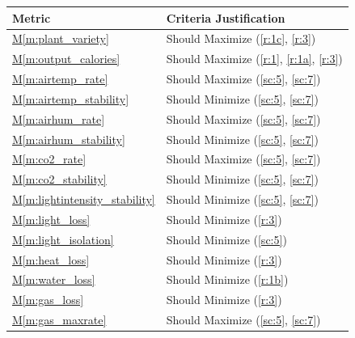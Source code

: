 \documentclass{../tex/report}
\newcommand{\mref}[1]{\hyperref[#1]{M\ref{#1}}}
\begin{document}
\begin{tabular}{|l|p{14.35cm}|}
    \hline
    \textbf{Metric}                     & \textbf{Criteria          \hfill Justification}                       \\ \hline
    \mref{m:plant_variety}              & Should Maximize           \hfill (\ref{r:1c}, \ref{r:3})              \\ \hline
    \mref{m:output_calories}            & Should Maximize           \hfill (\ref{r:1}, \ref{r:1a}, \ref{r:3})   \\ \hline
    \mref{m:airtemp_rate}               & Should Maximize           \hfill (\ref{sc:5}, \ref{sc:7})             \\ \hline
    \mref{m:airtemp_stability}          & Should Minimize           \hfill (\ref{sc:5}, \ref{sc:7})             \\ \hline
    \mref{m:airhum_rate}                & Should Maximize           \hfill (\ref{sc:5}, \ref{sc:7})             \\ \hline
    \mref{m:airhum_stability}           & Should Minimize           \hfill (\ref{sc:5}, \ref{sc:7})             \\ \hline
    \mref{m:co2_rate}                   & Should Maximize           \hfill (\ref{sc:5}, \ref{sc:7})             \\ \hline
    \mref{m:co2_stability}              & Should Minimize           \hfill (\ref{sc:5}, \ref{sc:7})             \\ \hline
    \mref{m:lightintensity_stability}   & Should Minimize           \hfill (\ref{sc:5}, \ref{sc:7})             \\ \hline
    \mref{m:light_loss}                 & Should Minimize           \hfill (\ref{r:3})                          \\ \hline
    \mref{m:light_isolation}            & Should Minimize           \hfill (\ref{sc:5})                         \\ \hline
    \mref{m:heat_loss}                  & Should Minimize           \hfill (\ref{r:3})                          \\ \hline
    \mref{m:water_loss}                 & Should Minimize           \hfill (\ref{r:1b})                         \\ \hline
    \mref{m:gas_loss}                   & Should Minimize           \hfill (\ref{r:3})                          \\ \hline
    \mref{m:gas_maxrate}                & Should Maximize           \hfill (\ref{sc:5}, \ref{sc:7})             \\ \hline

\end{tabular}
\end{document}
